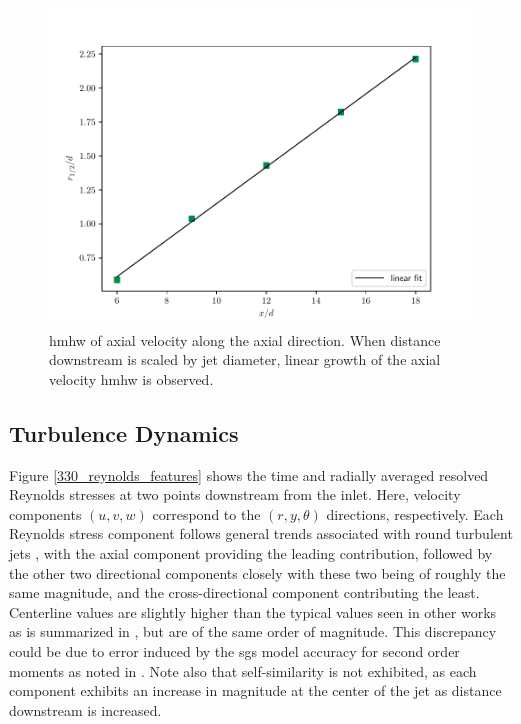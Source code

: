 \begin{figure}[htbp!]
\begin{center}
	\includegraphics[scale=.7]{figures/Plots/radial/slices_3/same_ambient/r12_d_vs_x_d.pdf}
	\caption{\gls{hmhw} of axial velocity along the axial direction. When distance downstream is scaled by jet diameter, linear growth of the axial velocity \gls{hmhw} is observed.} \label{330_hwhm_scaling}
\end{center}
\end{figure}

\subsection{Turbulence Dynamics}
Figure \ref{330_reynolds_features} shows the time and radially averaged resolved Reynolds stresses at two points downstream from the inlet. Here, velocity components $(u,v,w)$ correspond to the $(r,y,\theta)$ directions, respectively. Each Reynolds stress component follows general trends associated with round turbulent jets \cite{Pope, iso_comp_1_ref_1}, with the axial component providing the leading contribution, followed by the other two directional components closely with these two being of roughly the same magnitude, and the cross-directional component contributing the least. Centerline values are slightly higher than the typical values seen in other works as is summarized in \cite{iso_comp_1_ref_1}, but are of the same order of magnitude. This discrepancy could be due to error induced by the \gls{sgs} model accuracy for second order moments as noted in \cite{doi:10.1063/1.4937948}. Note also that self-similarity is not exhibited, as each component exhibits an increase in magnitude at the center of the jet as distance downstream is increased. 

